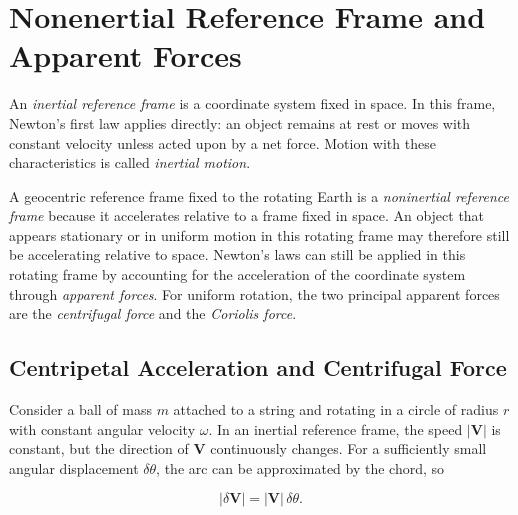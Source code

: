 \documentclass[10pt,twocolumn]{memoir}
\begin{document}
\section{Nonenertial Reference Frame and Apparent Forces}

An \textit{inertial reference frame} is a coordinate system fixed in space. In this frame, Newton's first law applies directly: an object remains at rest or moves with constant velocity unless acted upon by a net force. Motion with these characteristics is called \textit{inertial motion}.

A geocentric reference frame fixed to the rotating Earth is a \textit{noninertial reference frame} because it accelerates relative to a frame fixed in space. An object that appears stationary or in uniform motion in this rotating frame may therefore still be accelerating relative to space. Newton's laws can still be applied in this rotating frame by accounting for the acceleration of the coordinate system through \textit{apparent forces}. For uniform rotation, the two principal apparent forces are the \textit{centrifugal force} and the \textit{Coriolis force}.

\subsection{Centripetal Acceleration and Centrifugal Force}

Consider a ball of mass $m$ attached to a string and rotating in a circle of radius $r$ with constant angular velocity $\omega$. In an inertial reference frame, the speed $|\mathbf{V}|$ is constant, but the direction of $\mathbf{V}$ continuously changes. For a sufficiently small angular displacement $\delta\theta$, the arc can be approximated by the chord, so

\begin{equation}
    |\delta\mathbf{V}| = |\mathbf{V}|\,\delta\theta.
\end{equation}
\end{document}
